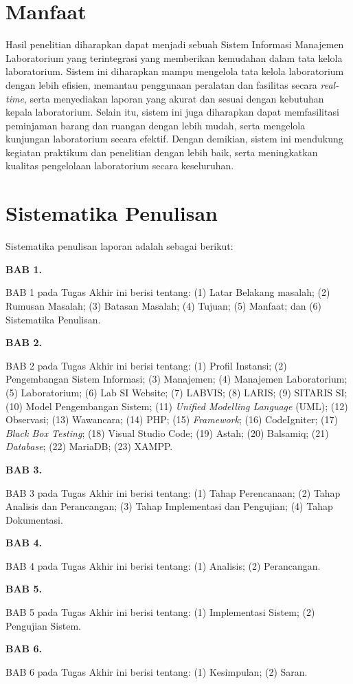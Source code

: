 \section{Manfaat}
Hasil penelitian diharapkan dapat menjadi sebuah Sistem Informasi Manajemen Laboratorium yang terintegrasi yang memberikan kemudahan dalam tata kelola laboratorium. Sistem ini diharapkan mampu mengelola tata kelola laboratorium dengan lebih efisien, memantau penggunaan peralatan dan fasilitas secara \textit{real-time}, serta menyediakan laporan yang akurat dan sesuai dengan kebutuhan kepala laboratorium. Selain itu, sistem ini juga diharapkan dapat memfasilitasi peminjaman barang dan ruangan dengan lebih mudah, serta mengelola kunjungan laboratorium secara efektif. Dengan demikian, sistem ini mendukung kegiatan praktikum dan penelitian dengan lebih baik, serta meningkatkan kualitas pengelolaan laboratorium secara keseluruhan.
\section{Sistematika Penulisan}
Sistematika penulisan laporan adalah sebagai berikut:

\textbf{BAB 1. \babSatu}

BAB 1 pada Tugas Akhir ini berisi tentang: (1) Latar Belakang masalah; (2) Rumusan Masalah; (3) Batasan Masalah; (4) Tujuan; (5) Manfaat; dan (6) Sistematika Penulisan.

\textbf{BAB 2. \babDua}

BAB 2 pada Tugas Akhir ini berisi tentang: (1) Profil Instansi; (2) Pengembangan Sistem Informasi; (3) Manajemen; (4) Manajemen Laboratorium; (5) Laboratorium; (6) Lab SI Website; (7) LABVIS; (8) LARIS; (9) SITARIS SI; (10) Model Pengembangan Sistem; (11) \textit{Unified Modelling Language} (UML); (12) Observasi; (13) Wawancara; (14) PHP; (15) \textit{Framework}; (16) CodeIgniter; (17) \textit{Black Box Testing}; (18) Visual Studio Code; (19) Astah; (20) Balsamiq; (21) \textit{Database}; (22) MariaDB; (23) XAMPP.

\textbf{BAB 3. \babTiga}

BAB 3 pada Tugas Akhir ini berisi tentang: (1) Tahap Perencanaan; (2) Tahap Analisis dan Perancangan; (3) Tahap Implementasi dan Pengujian; (4) Tahap Dokumentasi.

\textbf{BAB 4. \babEmpat}

BAB 4 pada Tugas Akhir ini berisi tentang: (1) Analisis; (2) Perancangan.

\textbf{BAB 5. \babLima}

BAB 5 pada Tugas Akhir ini berisi tentang: (1) Implementasi Sistem; (2) Pengujian Sistem.

\textbf{BAB 6. \babEnam}

BAB 6 pada Tugas Akhir ini berisi tentang: (1) Kesimpulan; (2) Saran.
